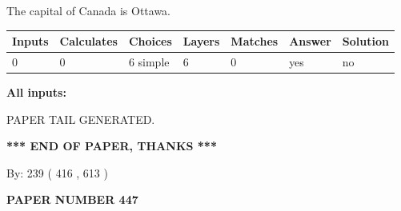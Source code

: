 \documentclass[12pt]{article}
\begin{document}
 
The capital of Canada is Ottawa.
 
 
\noindent{}
 
 
   
   
   
   
\noindent\begin{tabular}{|l|l|l|l|l|l|l|}
 \hline
Inputs & Calculates & Choices & Layers & Matches & Answer & Solution \\ \hline
 0  & 
 0  & 
 6
  simple  
  & 
 6  & 
 0  & 
  yes & 
  no 
  \\ \hline
 \end{tabular}
   
   
   
   
\noindent{}
   
   
   
   
\noindent\vspace{0.1in}\hspace{-0.08in} {\textbf{\Large{All inputs: }}}
   
   
   
   
   
   
 \vspace{0.2in}
 
   
   
\vspace{2.0in} PAPER TAIL GENERATED.
   
   
   
   
\vspace{1.0in} 
{\textbf{\large{ *** END OF PAPER, THANKS *** }}} 
   
   
\hspace{1.0in} By: 
 239 ( 416 ,  613 )
   
   
   
   
\newpage 
\setcounter{page}{ 
   447001 } 
   
   
   
   
 {\textbf{ \Large{ PAPER NUMBER  447  }}}
   
   
\vspace{0.2in}
   
   
   
   
   
   
   
\end{document}
